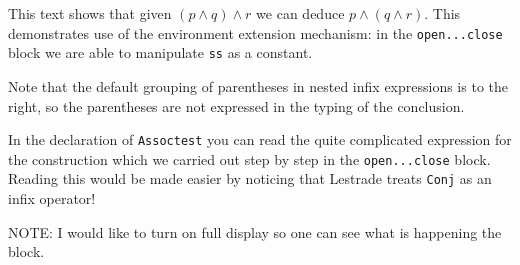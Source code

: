 \documentclass[12pt]{article}
\begin{document}
This text shows that given $(p \wedge q) \wedge r$ we can deduce $p \wedge (q \wedge r)$.  This demonstrates use of the environment extension mechanism:  in the {\tt open...close} block we are able to manipulate {\tt ss} as a constant.

Note that the default grouping of parentheses in nested infix expressions is to the right, so the parentheses are not expressed in the typing of the conclusion.

In the declaration of {\tt Assoctest} you can read the quite complicated expression for the construction which we carried out step by step in the {\tt open...close} block.  Reading this would be made easier by noticing that
Lestrade treats {\tt Conj} as an infix operator!

NOTE:  I would like to turn on full display so one can see what is happening the block.
\end{document}
